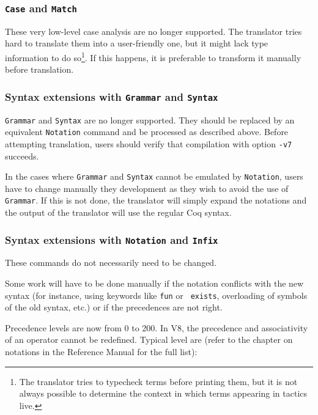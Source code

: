 \documentclass[11pt,a4paper]{article}
\begin{document}
\subsubsection{{\tt Case} and {\tt Match}}

These very low-level case analysis are no longer supported. The
translator tries hard to translate them into a user-friendly one, but
it might lack type information to do so\footnote{The translator tries
to typecheck terms before printing them, but it is not always possible
to determine the context in which terms appearing in tactics
live.}. If this happens, it is preferable to transform it manually
before translation.

\subsubsection{Syntax extensions with {\tt Grammar} and {\tt Syntax}}


{\tt Grammar} and {\tt Syntax} are no longer supported. They
should be replaced by an equivalent {\tt Notation} command and be
processed as described above. Before attempting translation, users
should verify that compilation with option {\tt -v7} succeeds.

In the cases where {\tt Grammar} and {\tt Syntax} cannot be emulated
by {\tt Notation}, users have to change manually they development as
they wish to avoid the use of {\tt Grammar}. If this is not done, the
translator will simply expand the notations and the output of the
translator will use the regular Coq syntax.

\subsubsection{Syntax extensions with {\tt Notation} and {\tt Infix}}

These commands do not necessarily need to be changed.

Some work will have to be done manually if the notation conflicts with
the new syntax (for instance, using keywords like {\tt fun} or {\tt
exists}, overloading of symbols of the old syntax, etc.) or if the
precedences are not right.

  Precedence levels are now from 0 to 200. In V8, the precedence and
associativity of an operator cannot be redefined. Typical level are
(refer to the chapter on notations in the Reference Manual for the
full list):
\end{document}
